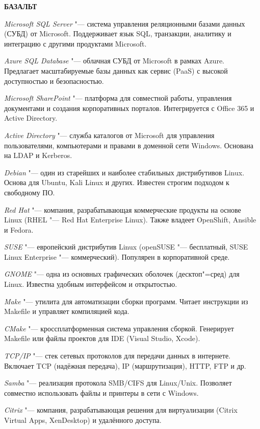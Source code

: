 \documentclass{article}
\begin{document}
\begin{center}
    \textbf{БАЗАЛЬТ}
\end{center}

\textit{Microsoft SQL Server} "--- система управления реляционными базами данных (СУБД) от Microsoft. Поддерживает язык SQL, транзакции, аналитику и интеграцию с другими продуктами Microsoft.

\textit{Azure SQL Database} "--- облачная СУБД от Microsoft в рамках Azure. Предлагает масштабируемые базы данных как сервис (PaaS) с высокой доступностью и безопасностью.

\textit{Microsoft SharePoint} "--- платформа для совместной работы, управления документами и создания корпоративных порталов. Интегрируется с Office 365 и Active Directory.

\textit{Active Directory} "--- служба каталогов от Microsoft для управления пользователями, компьютерами и правами в доменной сети Windows. Основана на LDAP и Kerberos.

\textit{Debian} "--- один из старейших и наиболее стабильных дистрибутивов Linux. Основа для Ubuntu, Kali Linux и других. Известен строгим подходом к свободному ПО.
	
\textit{Red Hat} "--- компания, разрабатывающая коммерческие продукты на основе Linux (RHEL "--- Red Hat Enterprise Linux). Также владеет OpenShift, Ansible и Fedora.
	
\textit{SUSE} "--- европейский дистрибутив Linux (openSUSE "--- бесплатный, SUSE Linux Enterprise "--- коммерческий). Популярен в корпоративной среде.
	
\textit{GNOME} "--- одна из основных графических оболочек (десктоп"=сред) для Linux. Известна удобным интерфейсом и открытостью.

\textit{Make} "--- утилита для автоматизации сборки программ. Читает инструкции из Makefile и управляет компиляцией кода.
	
\textit{CMake} "--- кроссплатформенная система управления сборкой. Генерирует Makefile или файлы проектов для IDE (Visual Studio, Xcode).
	
\textit{TCP/IP} "--- стек сетевых протоколов для передачи данных в интернете. Включает TCP (надёжная передача), IP (маршрутизация), HTTP, FTP и др.

\textit{Samba} "--- реализация протокола SMB/CIFS для Linux/Unix. Позволяет совместно использовать файлы и принтеры в сети с Windows.

\textit{Citrix} "--- компания, разрабатывающая решения для виртуализации (Citrix Virtual Apps, XenDesktop) и удалённого доступа.
\end{document}

